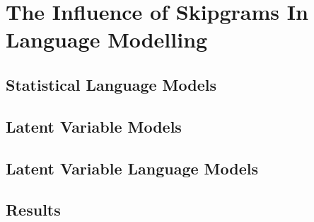 
\chapter{The Influence of Skipgrams In Language Modelling}

\section{Statistical Language Models}
\label{ch:languagemodels}


\section{Latent Variable Models}
\label{ch:latentvariablemodels}


\section{Latent Variable Language Models}
\label{ch:latentvariablelanguagemodels}


\section{Results}
\label{ch:results}

